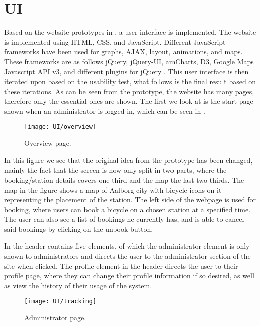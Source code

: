 \section{UI}
Based on the website prototypes in , a user interface is implemented.
The website is implemented using HTML, CSS, and JavaScript. 
Different JavaScript frameworks have been used for graphs, AJAX, layout, animations, and maps. 
These frameworks are as follows jQuery, jQuery-UI, amCharts, D3, Google Maps Javascript API v3, and different plugins for jQuery \citep{misc:googlehostedlibs, misc:d3js, misc:googlemapsapi, misc:amcharts}.
This user interface is then iterated upon based on the usability test, what follows is the final result based on these iterations. 
As can be seen from the prototype, the website has many pages, therefore only the essential ones are shown.
The first we look at is the start page shown when an administrator is logged in, which can be seen in .

\begin{figure}[h]
	\centering
	\texttt{[image: UI/overview]}
	\caption{Overview page.}\label{fig:UI-overview}
\end{figure}

In this figure we see that the original idea from the prototype has been changed, mainly the fact that the screen is now only split in two parts, where the booking/station details covers one third and the map the last two thirds.
The map in the figure shows a map of Aalborg city with bicycle icons on it representing the placement of the station.
The left side of the webpage is used for booking, where users can book a bicycle on a chosen station at a specified time.
The user can also see a list of bookings he currently has, and is able to cancel said bookings by clicking on the unbook button.

In  the header contains five elements, of which the administrator element is only shown to administrators and directs the user to the administrator section of the site when clicked.
The profile element in the header directs the user to their profile page, where they can change their profile information if so desired, as well as view the history of their usage of the system.

\begin{figure}[h]
	\centering
	\texttt{[image: UI/tracking]}
	\caption{Administrator page.}\label{fig:UI-admin}
\end{figure}

